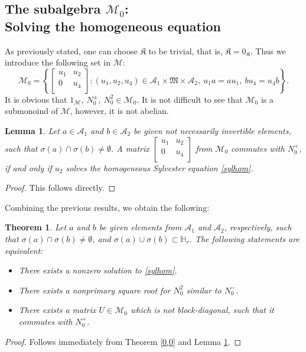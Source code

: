 \documentclass{article}
\newtheorem{theorem}{Theorem}[section]
\newtheorem{lemma}{Lemma}[section]
\theoremstyle{definition}
\def\A{{\mathcal{A}}}
\def\M{\mathfrak{M}}
\def\K{\mathfrak{K}}
\def\HR{\mathbb{H}_r}
\newcommand{\mat}[4]{\left[\begin{array}{cc}#1 & #2 \\ #3 & #4 \\
	\end{array}\right]}
\begin{document}
\subsection{The  subalgebra $\mathcal{M}_0$:\\ Solving the homogeneous equation}
As previously stated, one can choose $\K$ to be trivial, that is, $\K=0_{\K}$. Thus we introduce the following set in $\mathcal{M}$:
\begin{equation}\label{M0}\mathcal{M}_0=\left\{\mat{u_1}{u_2}{0}{u_4}: (u_1,u_2,u_4)\in\A_1\times\M\times\A_2,\  u_1a=au_1,\  bu_4=u_4b\right\}.\end{equation}
It is obvious that $1_{\mathcal{M}},\ N^{\pm}_0, \ N_0^2\in\mathcal{M}_0$.  It is not difficult to see that  $\mathcal{M}_0$ is a submonoind of $\mathcal{M}$, however, it is not abelian. 
\begin{lemma}\label{n0+} Let $a\in\A_1$ and $b\in\A_2$ be given not necessarily invertible elements, such that $\sigma(a)\cap\sigma(b)\neq\emptyset$. A matrix $\mat{u_1}{u_2}{0}{u_4}$ from $\mathcal{M}_0$ commutes with $N_0^+$, if and only if $u_{2}$ solves the homogeneous Sylvester equation \eqref{sylhom}.
\end{lemma} 
\begin{proof} This follows directly. \end{proof}
\noindent Combining the previous results, we obtain the following:
\begin{theorem}\label{main1} Let $a$ and $b$ be given elements from $\A_1$ and $\A_2$, respectively, such that $\sigma(a)\cap\sigma(b)\neq\emptyset$, and  $\sigma(a)\cup\sigma(b)\subset\HR$. The following statements are equivalent:
\begin{itemize}
\item[(a)] There exists a nonzero solution to \eqref{sylhom}.
\item[(b)] There exists a nonprimary square root for $N_0^2$ similar to $N_0^-$.
\item[(c)] There exists a matrix $U\in\mathcal{M}_0$ which is not block-diagonal, such that it commutes with $N_0^+$.
\end{itemize}
\end{theorem}
\begin{proof} Follows immediately from Theorem \ref{0,0} and Lemma \ref{n0+}.
\end{proof}
\end{document}
